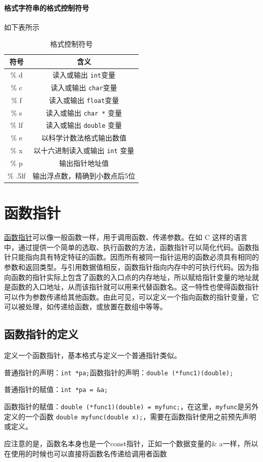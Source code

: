 \documentclass[]{report}
\begin{document}
		\paragraph{格式字符串的格式控制符号}如下表所示
		\begin{table}[h]
			\centering
			\caption{格式控制符号}
			\begin{tabular}{c|c}
				\toprule
				符号&含义\\
				\midrule
				\% d&读入或输出 \verb|int|变量\\
				\% c&读入或输出 \verb|char|变量\\
				\% f&读入或输出 \verb|float|变量\\
				\% s&读入或输出 \verb|char *| 变量\\
				\% lf&读入或输出 \verb|double| 变量\\
				\% e&以科学计数法格式输出数值\\
				\% x&以十六进制读入或输出 \verb|int| 变量\\
				\% p&输出指针地址值  \\
				\% .5lf&输出浮点数，精确到小数点后5位\\
				\bottomrule
			\end{tabular}
		\end{table}
	\section{函数指针}
		\href{https://en.wikipedia.org/wiki/Function_pointer}{函数指针}可以像一般函数一样，用于调用函数、传递参数。在如 C 这样的语言中，通过提供一个简单的选取、执行函数的方法，函数指针可以简化代码。函数指针只能指向具有特定特征的函数。因而所有被同一指针运用的函数必须具有相同的参数和返回类型。与引用数据值相反，函数指针指向内存中的可执行代码。因为指向函数的指针实际上包含了函数的入口点的内存地址，所以赋给指针变量的地址就是函数的入口地址，从而该指针就可以用来代替函数名。这一特性也使得函数指针可以作为参数传递给其他函数。由此可见，可以定义一个指向函数的指针变量，它可以被处理，如传递给函数，或放置在数组中等等。
		\subsection{函数指针的定义}
		定义一个函数指针，基本格式与定义一个普通指针类似。\par
		普通指针的声明：\verb|int *pa;|\qquad 函数指针的声明：\verb|double (*func1)(double);|\par
		普通指针的赋值：\verb|int *pa = &a;|\par 函数指针的赋值：\verb|double (*func1)(double) = myfunc;|，在这里，\verb|myfunc|是另外定义的一个函数 \verb|double myfunc(double x);|，需要在函数指针使用之前预先声明或定义。\par
		应注意的是，函数名本身也是一个const指针，正如一个数据变量的\& a一样，所以在使用的时候也可以直接将函数名传递给调用者函数
\end{document}
